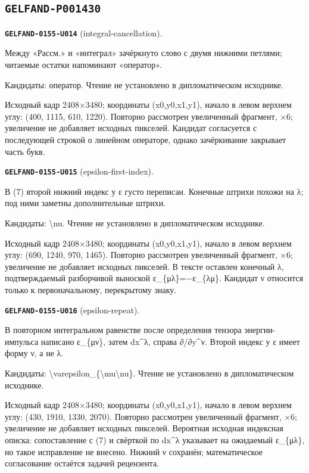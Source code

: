 \subsection*{\texttt{GELFAND-P001430}}
\par\noindent\leavevmode{}\label{GELFAND-0155-U014}\label{GELFAND-P001430:integral-cancellation}\textbf{\texttt{GELFAND-0155-U014}} (integral-cancellation).\nopagebreak[4]\par
Между «Рассм.» и «интеграл» зачёркнуто слово с двумя нижними петлями; читаемые остатки напоминают «оператор».\par
Кандидаты: оператор. Чтение не установлено в дипломатическом исходнике.\par
Исходный кадр 2408×3480; координаты (x0,y0,x1,y1), начало в левом верхнем углу: (400, 1115, 610, 1220). Повторно рассмотрен увеличенный фрагмент, ×6; увеличение не добавляет исходных пикселей. Кандидат согласуется с последующей строкой о линейном операторе, однако зачёркивание закрывает часть букв.\par
\medskip
\par\noindent\leavevmode{}\label{GELFAND-0155-U015}\label{GELFAND-P001430:epsilon-first-index}\textbf{\texttt{GELFAND-0155-U015}} (epsilon-first-index).\nopagebreak[4]\par
В (7) второй нижний индекс у ε густо переписан. Конечные штрихи похожи на λ; под ними заметны дополнительные штрихи.\par
Кандидаты: \textbackslash{}nu. Чтение не установлено в дипломатическом исходнике.\par
Исходный кадр 2408×3480; координаты (x0,y0,x1,y1), начало в левом верхнем углу: (690, 1240, 970, 1465). Повторно рассмотрен увеличенный фрагмент, ×6; увеличение не добавляет исходных пикселей. В тексте оставлен конечный λ, подтверждаемый разборчивой выноской ε\_\{μλ\}=−ε\_\{λμ\}. Кандидат ν относится только к первоначальному, перекрытому знаку.\par
\medskip
\par\noindent\leavevmode{}\label{GELFAND-0155-U016}\label{GELFAND-P001430:epsilon-repeat}\textbf{\texttt{GELFAND-0155-U016}} (epsilon-repeat).\nopagebreak[4]\par
В повторном интегральном равенстве после определения тензора энергии-импульса написано ε\_\{μν\}, затем dx\textasciicircum{}λ, справа ∂/∂y\textasciicircum{}ν. Второй индекс у ε имеет форму ν, а не λ.\par
Кандидаты: \textbackslash{}varepsilon\_\{\textbackslash{}mu\textbackslash{}nu\}. Чтение не установлено в дипломатическом исходнике.\par
Исходный кадр 2408×3480; координаты (x0,y0,x1,y1), начало в левом верхнем углу: (430, 1910, 1330, 2070). Повторно рассмотрен увеличенный фрагмент, ×6; увеличение не добавляет исходных пикселей. Вероятная исходная индексная описка: сопоставление с (7) и свёрткой по dx\textasciicircum{}λ указывает на ожидаемый ε\_\{μλ\}, но такое исправление не внесено. Нижний ν сохранён; математическое согласование остаётся задачей рецензента.\par
\medskip
